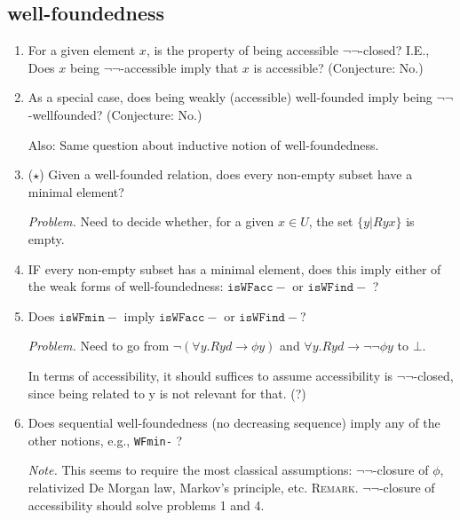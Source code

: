 \documentclass{scrartcl}
\begin{document}
\subsection*{well-foundedness}
\begin{enumerate}
  \item For a given element $x$, is the property of
  being accessible $\lnot\lnot$-closed? I.E.,
  Does $x$ being $\lnot\lnot$-accessible imply that $x$ is accessible?
  (Conjecture: No.)

  \item As a special case, does being weakly (accessible) well-founded imply being $\lnot\lnot$-wellfounded?
  (Conjecture: No.)

  Also: Same question about inductive notion of well-foundedness.

  \item ($\star$) Given a well-founded relation, does every non-empty subset
  have a minimal element?

  \emph{Problem.} Need to decide whether, for a given $x \in U$,
   the set $\{y | Ryx\}$ is empty.

   \item IF every non-empty subset has a minimal element, does this imply
   either of the weak forms of well-foundedness: $\mathtt{isWFacc-}$ or
   $\mathtt{isWFind-}$ ?

   \item Does $\mathtt{isWFmin-}$ imply $\mathtt{isWFacc-}$ or $\mathtt{isWFind-}$?

   \emph{Problem.} Need to go from $\lnot (\forall y. R y d \to \phi y)$
   and $\forall y. R y d \to \lnot \lnot \phi y$ to $\bot$.

   In terms of accessibility, it should suffices to assume accessibility is
   $\lnot\lnot$-closed, since being related to y is not relevant for that. (?)

   \item Does sequential well-foundedness (no decreasing sequence) imply
   any of the other notions, e.g., \texttt{WFmin-} ?

   \emph{Note.}  This seems to require the most classical assumptions:
   $\lnot\lnot$-closure of $\phi$, relativized De Morgan law,
   Markov's principle, etc.
   \textsc{Remark.}
   $\lnot\lnot$-closure of accessibility should solve problems 1 and 4.
 


\end{enumerate}

\newpage 
\end{document}
